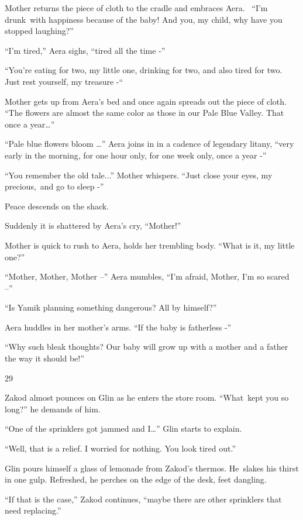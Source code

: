 \documentclass[twoside,11pt]{book}
\begin{document}
Mother returns the piece of cloth to the cradle and embraces Aera. ~``I'm drunk~with happiness because of
the baby! And you, my child, why have you stopped laughing?'' 

``I'm tired,'' Aera sighs, ``tired all the time -'' 

``You're eating for two, my little one, drinking for two, and also tired for two. Just rest yourself, my
treasure -``~ 

Mother gets up from Aera's bed and once again spreads out the piece of cloth. ``The flowers are almost the
same color as those in our Pale Blue Valley. That once a year{\dots}'' 

``Pale blue flowers bloom {\dots}'' Aera joins in in a cadence of legendary litany,
``very early in the morning, for one hour only, for one week only, once a year -''

``You remember the old tale...'' Mother whispers. ``Just close your eyes, my
precious,~and go to sleep -'' 

Peace descends on the shack. 

Suddenly it is shattered by Aera's cry, ``Mother!'' 

Mother is quick to rush to Aera, holds her trembling body. ``What is it, my little one?'' 

``Mother, Mother, Mother --'' Aera mumbles, ``I'm afraid, Mother, I'm so scared
--'' 

``Is Yamik planning something dangerous? All by himself?'' 

Aera huddles in her mother's arms. ``If the baby is fatherless -''

``Why such bleak thoughts? Our baby will grow up with a mother and a father the way it should
be!''


\bigskip

29~~\ 

Zakod almost pounces on Glin as he enters the store room. ``What\ kept you so long?'' he
demands of him.\ 

``One of the sprinklers got jammed and I{\dots}{}'' Glin starts to explain. 

``Well, that is a relief. I worried for nothing. You look tired out.'' 

Glin pours himself a glass of lemonade from Zakod's thermos. He{\ }slakes his
thirst in one gulp. Refreshed, he perches on the edge of the desk, feet dangling. 

{}``If that is the case,'' Zakod continues, ``maybe there are other sprinklers that need replacing.'' 
\end{document}

